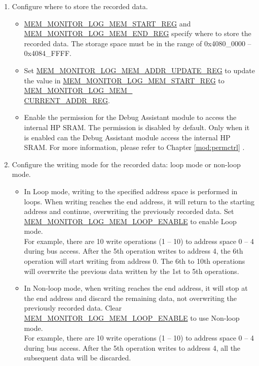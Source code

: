 \documentclass[main\_\_EN.tex]{subfiles}
\begin{document}
\begin{enumerate}
\item Configure where to store the recorded data.
        \begin{itemize}
            \item \hyperref[regdesc:MEMMONITORLOGMEMSTARTREG]{MEM\_MONITOR\_LOG\_MEM\_START\_REG} and \hyperref[regdesc:MEMMONITORLOGMEMENDREG]{MEM\_MONITOR\_LOG\_MEM\_END\_REG} specify where to store the recorded data. The storage space must be in the range of 0x4080\_0000 – 0x4084\_FFFF.
            \item Set \hyperref[regdesc:MEMMONITORLOGMEMADDRUPDATEREG]{MEM\_MONITOR\_LOG\_MEM\_ADDR\_UPDATE\_REG} to update the value in \hyperref[regdesc:MEMMONITORLOGMEMSTARTREG]{MEM\_MONITOR\_LOG\_MEM\_START\_REG} to \hyperref[regdesc:MEMMONITORLOGMEMCURRENTADDRREG]{MEM\_MONITOR\_LOG\_MEM\_\\CURRENT\_ADDR\_REG}.
            \item Enable the permission for the Debug Assistant module to access the internal HP SRAM. The permission is disabled by default. Only when it is enabled can the Debug Assistant module access the internal HP SRAM. For more information, please refer to Chapter \ref{mod:permctrl} \textit{}.
        \end{itemize}

\item Configure the writing mode for the recorded data: loop mode or non-loop mode.
        \begin{itemize}
            \item In Loop mode, writing to the specified address space is performed in loops. When writing reaches the end address, it will return to the starting address and continue, overwriting the previously recorded data. Set \hyperref[fielddesc:MEMMONITORLOGMEMLOOPENABLE]{MEM\_MONITOR\_LOG\_MEM\_LOOP\_ENABLE} to enable Loop mode.\\
           For example, there are 10 write operations (1 – 10) to address space 0 – 4 during bus access. After the 5th operation writes to address 4, the 6th operation will start writing from address 0. The 6th to 10th operations will overwrite the previous data written by the 1st to 5th operations.
            \item In Non-loop mode, when writing reaches the end address, it will stop at the end address and discard the remaining data, not overwriting the previously recorded data. Clear \hyperref[fielddesc:MEMMONITORLOGMEMLOOPENABLE]{MEM\_MONITOR\_LOG\_MEM\_LOOP\_ENABLE} to use Non-loop mode.\\
            For example, there are 10 write operations (1 – 10) to address space 0 – 4 during bus access. After the 5th operation writes to address 4, all the subsequent data will be discarded.
        \end{itemize}


\end{enumerate}
\end{document}
